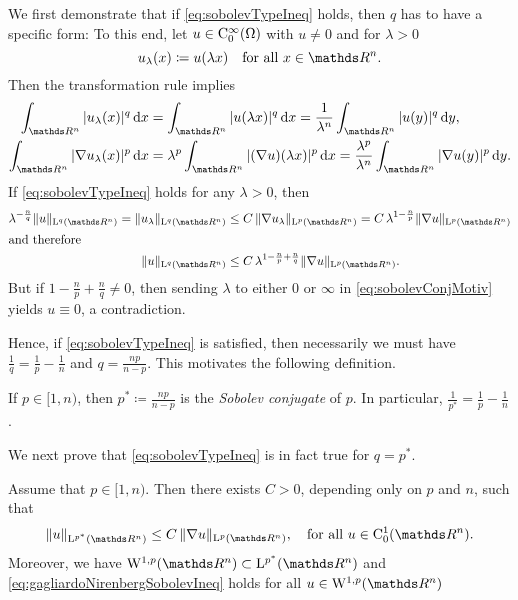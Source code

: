 \begin{motiv}
  We first demonstrate that if \eqref{eq:sobolevTypeIneq} holds, then $q$ has to have a specific form:
  To this end, let $u \in \mathrm{C}_0^\infty(\Omega)$ with $u \neq 0$ and for $\lambda > 0$
  $$
  u_\lambda(x) \coloneqq u(\lambda x) \quad\text{for all } x \in \R^n.
  $$
  Then the transformation rule implies
  \begin{align*}
    \int_{\R^n} |u_\lambda(x)|^q \d x 
    &= \int_{\R^n} |u(\lambda x)|^q \d x
    = \frac{1}{\lambda^n} \int_{\R^n} |u(y)|^q \d y, \\
    \int_{\R^n} |\nabla u_\lambda(x) |^p \d x &= \lambda^p \int_{\R^n} |(\nabla u)(\lambda x)|^p \d x = \frac{\lambda^p}{\lambda^n} \int_{\R^n} |\nabla u(y)|^p \d y.
  \end{align*}
  If \eqref{eq:sobolevTypeIneq} holds for any $\lambda > 0$, then 
  \begin{align}
  \lambda^{-\frac{n}{q}} \| u\|_{\Ell^q(\R^n)}
  = \| u_\lambda\|_{\Ell^q(\R^n)}
    &\leq C \, \|\nabla u_\lambda\|_{\Ell^p(\R^n)}
  = C \, \lambda^{1 - \frac{n}{p}} \| \nabla u \|_{\Ell^p(\R^n)} \nonumber\\
  \intertext{and therefore}
    \label{eq:sobolevConjMotiv}
    \|u \|_{\Ell^q(\R^n)} 
    &\leq C \, \lambda^{1 - \frac{n}{p} + \frac{n}{q}} \|\nabla u\|_{\Ell^p(\R^n)}.
\end{align}
  But if $1 - \frac{n}{p} + \frac{n}{q} \neq 0$, then sending $\lambda$ to either $0$ or $\infty$ in \eqref{eq:sobolevConjMotiv} yields $u \equiv 0$, a contradiction.

  Hence, if \eqref{eq:sobolevTypeIneq} is satisfied, then necessarily we must have $\frac{1}{q} = \frac{1}{p} - \frac{1}{n}$ and $q = \frac{n p }{n - p}$.
  This motivates the following definition.
\end{motiv}

\begin{defn}
  If $p \in [1,n)$, then $p^* \coloneqq \frac{np}{n - p}$ is the \emph{Sobolev conjugate} of $p$.
  In particular, $\frac{1}{p^*} = \frac{1}{p} - \frac{1}{n}$.
\end{defn}

We next prove that \eqref{eq:sobolevTypeIneq} is in fact true for $q = p^*$.

\begin{thm}
  \label{thm:gagliardoNirenberg}
  Assume that $p \in [1,n)$.
  Then there exists $C > 0$, depending only on $p$ and $n$, such that
  \begin{equation}
    \label{eq:gagliardoNirenbergSobolevIneq}
    \| u\|_{\Ell^{p^*}(\R^n)} \leq C \, \|\nabla u\|_{\Ell^p(\R^n)}, \quad\text{for all } u \in \CC_0^1(\R^n).
  \end{equation}
  Moreover, we have $\WW^{1,p}(\R^n) \subset \Ell^{p^*}(\R^n)$ and \eqref{eq:gagliardoNirenbergSobolevIneq} holds for all $u \in \WW^{1,p}(\R^n)$
\end{thm}

